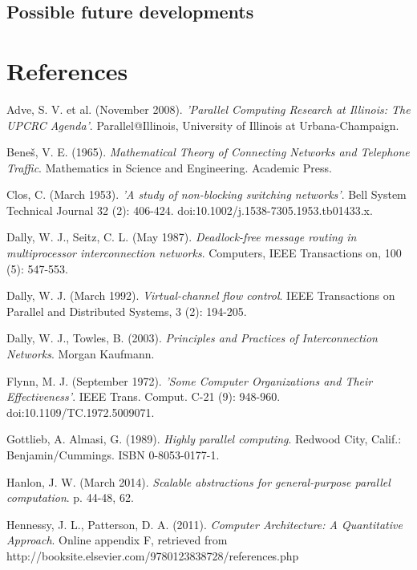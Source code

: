 \documentclass[a4paper, 12pt]{article}
\begin{document}
\subsection{Possible future developments}



\newpage
\section{References}

\begin{thebibliography}{30}

 Adve, S. V. et al. (November 2008). \textit{'Parallel Computing Research at Illinois: The UPCRC Agenda'}. Parallel@Illinois, University of Illinois at Urbana-Champaign.

 Bene\v{s}, V. E. (1965). \textit{Mathematical Theory of Connecting Networks and Telephone Traffic}. Mathematics in Science and Engineering. Academic Press.

 Clos, C. (March 1953). \textit{'A study of non-blocking switching networks'}. Bell System Technical Journal 32 (2): 406-424. doi:10.1002/j.1538-7305.1953.tb01433.x.

 Dally, W. J., Seitz, C. L. (May 1987). \textit{Deadlock-free message routing in multiprocessor interconnection networks}. Computers, IEEE Transactions on, 100 (5): 547-553.

 Dally, W. J. (March 1992). \textit{Virtual-channel flow control}. IEEE Transactions on Parallel and Distributed Systems, 3 (2): 194-205.

 Dally, W. J., Towles, B. (2003). \textit{Principles and Practices of Interconnection Networks}. Morgan Kaufmann.

 Flynn, M. J. (September 1972). \textit{'Some Computer Organizations and Their Effectiveness'}. IEEE Trans. Comput. C-21 (9): 948-960. doi:10.1109/TC.1972.5009071.

 Gottlieb, A. Almasi, G. (1989). \textit{Highly parallel computing}. Redwood City, Calif.: Benjamin/Cummings. ISBN 0-8053-0177-1.

 Hanlon, J. W. (March 2014). \textit{Scalable abstractions for general-purpose parallel computation}. p. 44-48, 62.

 Hennessy, J. L., Patterson, D. A. (2011). \textit{Computer Architecture: A Quantitative Approach}. Online appendix F, retrieved from http://booksite.elsevier.com/9780123838728/references.php


\end{thebibliography}
\end{document}
